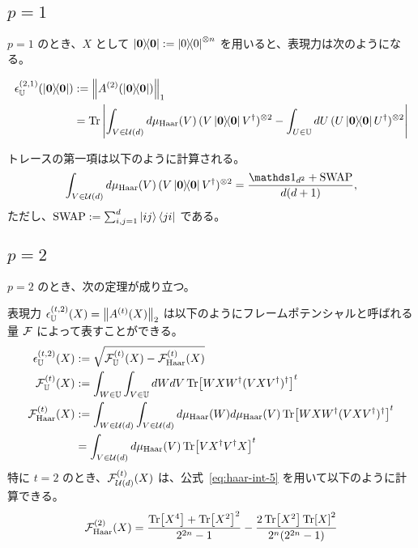 \subsection{$p = 1$}
$p = 1$ のとき、$X$ として $\dyad{\bs{0}} := \dyad{0}\otn{n}$ を用いると、表現力は次のようになる。

\begin{align}
    \epsilon_{\bbU}^{(2,1)}(\dyad{\bs{0}}) &:= \norm{A^{(2)}(\dyad{\bs{0}})}_1\nonumber\\
    &= \Tr\abs{\int_{V\in\calU(d)} d\mu_{\Haar}(V)\,(V\dyad{\bs{0}}V\dg)\otn{2} - \int_{U\in\bbU} dU\,(U\dyad{\bs{0}}U\dg)\otn{2}}
\end{align}

トレースの第一項は以下のように計算される\cite{zhang2015matrix}。
\begin{align}
    \int_{V\in\calU(d)} d\mu_{\Haar}(V)\,(V\dyad{\bs{0}}V\dg)\otn{2} = \frac{\bbid_{d^2} + \SWAP}{d(d+1)},
\end{align}
ただし、$\mathrm{SWAP} := \sum_{i,j=1}^d \ket{ij}\bra{ji}$ である。


\subsection{$p = 2$}
$p = 2$ のとき、次の定理が成り立つ。
\begin{screen}
    \begin{theorem}
        表現力 $\epsilon_{\mathbb{U}}^{(t,2)}(X) = \norm{A^{(t)}(X)}_2$ は以下のようにフレームポテンシャルと呼ばれる量 $\mathcal{F}$ によって表すことができる\cite{holmes2022connecting}。
        \begin{align}
            \epsilon_{\mathbb{U}}^{(t,2)}(X) &:= \sqrt{\mathcal{F}_{\mathbb{U}}^{(t)}(X) - \mathcal{F}_{\mathrm{Haar}}^{(t)}(X) }\\
            \mathcal{F}_{\mathbb{U}}^{(t)}(X) &:= \int_{W\in\mathbb{U}}\int_{V\in\mathbb{U}} dWdV \Tr[WXW^\dagger (VXV^\dagger)^\dagger]^t\\
            \mathcal{F}_{\mathrm{Haar}}^{(t)}(X)
            &:= \int_{W\in\mathcal{U}(d)}\int_{V\in\mathcal{U}(d)} d\mu_{\mathrm{Haar}}(W)d\mu_{\mathrm{Haar}}(V) \Tr[WXW^\dagger (VXV^\dagger)^\dagger]^t\nonumber\\
            &= \int_{V\in\mathcal{U}(d)} d\mu_{\mathrm{Haar}}(V) \Tr[VX^\dagger V^\dagger X]^t
        \end{align}
        特に $t=2$ のとき、$\mathcal{F}_{\mathcal{U}(d)}^{(t)}(X)$ は、公式~\eqref{eq:haar-int-5} を用いて以下のように計算できる。
        \begin{align}
            \mathcal{F}_{\mathrm{Haar}}^{(2)}(X) = \frac{\Tr[X^4] + \Tr[X^2]^2}{2^{2n} - 1} - \frac{2\Tr[X^2]\Tr[X]^2}{2^n(2^{2n} - 1)}
        \end{align}
    \end{theorem}
\end{screen}


